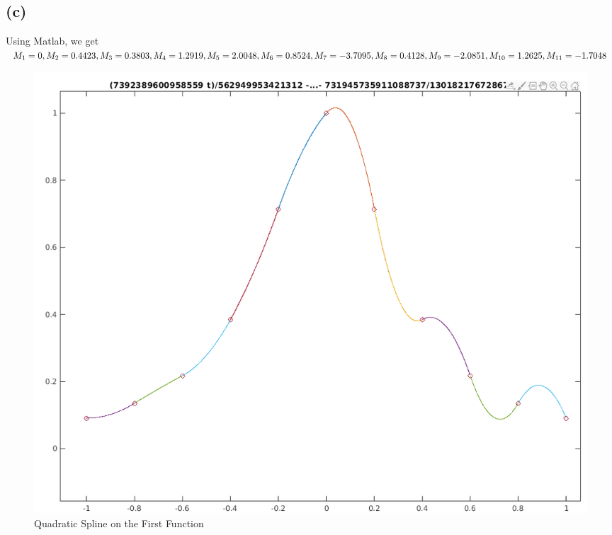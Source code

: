 \documentclass{article}
\begin{document}
\subsection*{(c)}
Using Matlab, we get
$\\ M_1 = 0, \\ M_2 = 0.4423, \\M_3 = 0.3803, \\M_4 = 1.2919, \\M_5 = 2.0048, \\M_6 = 0.8524, \\M_7 = -3.7095, \\M_8 = 0.4128, \\M_9 =- 2.0851, \\M_{10} = 1.2625, \\M_{11} = -1.7048 $

\begin{figure}
\caption{Quadratic Spline on the First Function}
\centering
\includegraphics[scale=.4]{hw_7_plot_p3}
\end{figure}
\end{document}
